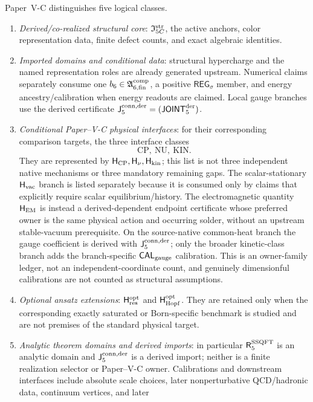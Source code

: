 \documentclass[12pt,a4paper]{article}
\newcommand{\Hkin}{\mathsf{H}_{\rm kin}}
\newcommand{\Hem}{\mathsf{H}_{\rm EM}}
\newcommand{\Hvac}{\mathsf{H}_{\rm vac}}
\newcommand{\Hcp}{\mathsf{H}_{\rm CP}}
\newcommand{\Hnu}{\mathsf{H}_{\nu}}
\newcommand{\Rconn}{\mathsf J_5^{\rm conn,der}}
\newcommand{\Rssqft}{\mathsf R_5^{\rm SSQFT}}
\newcommand{\JOINTfiveocc}{\mathsf{JOINT}_{5}^{\rm der}}
\newcommand{\CALgauge}{\mathsf{CAL}_{\rm gauge}}
\newcommand{\REGsig}{\mathsf{REG}_{\sigma}}
\newcommand{\Istr}{\mathfrak I_{5C}^{\rm str}}
\newcommand{\Acompsix}{\mathfrak A_{6,{\rm fin}}^{\rm comp}}
\newcommand{\Hresopt}{\mathsf H_{\rm res}^{\rm opt}}
\newcommand{\Hhopfopt}{\mathsf H_{\rm Hopf}^{\rm opt}}
\begin{document}
\begin{definition}
\label{p7v2:def:selector-status-partition}
Paper~V-C distinguishes five logical classes.
\begin{enumerate}[label=(\roman*),leftmargin=2.5em]
 \item \emph{Derived/co-realized structural core}: \(\Istr\), the active anchors,
 color representation data, finite defect counts, and exact algebraic
 identities.
 \item \emph{Imported domains and conditional data}: structural hypercharge
 and the named representation roles are already generated upstream.  Numerical
 claims separately consume one \(b_6\in\Acompsix\), a positive \(\REGsig\)
 member, and energy ancestry/calibration when energy readouts are claimed.  Local gauge
 branches use the derived certificate \(\Rconn=(\JOINTfiveocc)\).
 \item \emph{Conditional Paper--V-C physical interfaces}: for their
 corresponding comparison targets, the three interface classes
 \[
  \boxed{\mathrm{CP},\ \mathrm{NU},\ \mathrm{KIN}}.
 \]
 They are represented by \(\Hcp,\Hnu,\Hkin\); this list is not three
 independent native mechanisms or three mandatory remaining gaps.  The scalar-stationary \(\Hvac\) branch is listed separately because it is consumed only by claims that explicitly require scalar equilibrium/history.  The electromagnetic quantity \(\Hem\) is instead a derived-dependent endpoint certificate whose preferred owner is the same physical action and occurring solder, without an upstream stable-vacuum prerequisite.  On the
 source-native common-heat branch the gauge coefficient is derived with
 \(\Rconn\); only the broader kinetic-class branch adds the branch-specific
 \(\CALgauge\) calibration.  This is an owner-family ledger, not an
 independent-coordinate count, and genuinely dimensionful calibrations are
 not counted as structural assumptions.
 \item \emph{Optional ansatz extensions}: \(\Hresopt\) and \(\Hhopfopt\).
 They are retained only when the corresponding exactly saturated or
 Born-specific benchmark is studied and are not premises of the standard
 physical target.
 \item \emph{Analytic theorem domains and derived imports}: in particular
 \(\Rssqft\) is an analytic domain and \(\Rconn\) is a derived import; neither
 is a finite realization selector or Paper--V-C owner.  Calibrations and
 downstream interfaces include absolute scale choices,
 later nonperturbative QCD/hadronic data, continuum vertices, and later

\end{enumerate}
\end{definition}
\end{document}
